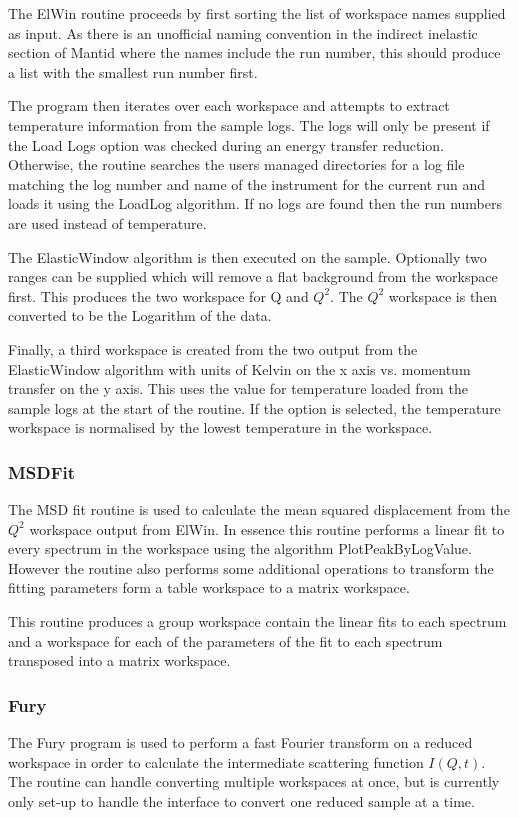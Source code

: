\documentclass[paper=a4, fontsize=11pt]{scrartcl}	%
\numberwithin{equation}{section}															%
\numberwithin{figure}{section}																%
\numberwithin{table}{section}																%
\begin{document}
The ElWin routine proceeds by first sorting the list of workspace names supplied as input. As there is an unofficial naming convention in the indirect inelastic section of Mantid where the names include the run number, this should produce a list with the smallest run number first.

The program then iterates over each workspace and attempts to extract temperature information from the sample logs. The logs will only be present if the Load Logs option was checked during an energy transfer reduction. Otherwise, the routine searches the users managed directories for a log file matching the log number and name of the instrument for the current run and loads it using the LoadLog algorithm. If no logs are found then the run numbers are used instead of temperature.

The ElasticWindow algorithm is then executed on the sample. Optionally two ranges can be supplied which will remove a flat background from the workspace first. This produces the two workspace for Q and $Q^2$. The $Q^2$ workspace is then converted to be the Logarithm of the data.

Finally, a third workspace is created from the two output from the ElasticWindow algorithm with units of Kelvin on the x axis vs. momentum transfer on the y axis. This uses the value for temperature loaded from the sample logs at the start of the routine. If the option is selected, the temperature workspace is normalised by the lowest temperature in the workspace.

\subsubsection{MSDFit}
\label{subsubsec:msdfit}
The MSD fit routine is used to calculate the mean squared displacement from the $Q^2$ workspace output from ElWin. In essence this routine performs a linear fit to every spectrum in the workspace using the algorithm PlotPeakByLogValue. However the routine also performs some additional operations to transform the fitting parameters form a table workspace to a matrix workspace.

This routine produces a group workspace contain the linear fits to each spectrum and a workspace for each of the parameters of the fit to each spectrum transposed into a matrix workspace.

\subsubsection{Fury}
The Fury program is used to perform a fast Fourier transform on a reduced workspace in order to calculate the intermediate scattering function $I(Q,t)$. The routine can handle converting multiple workspaces at once, but is currently only set-up to handle the interface to convert one reduced sample at a time.
\end{document}
